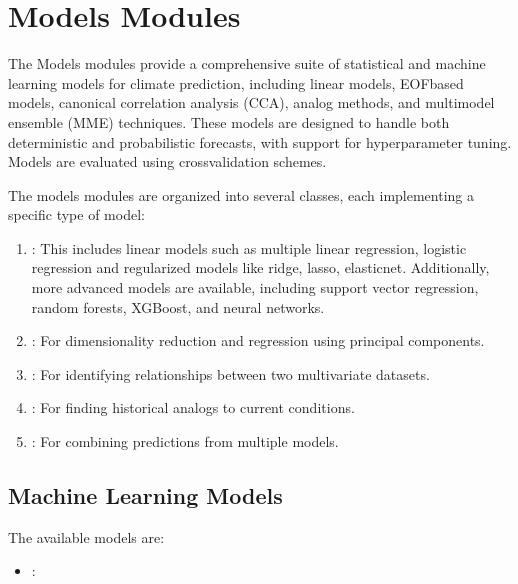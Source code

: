 \documentclass[letterpaper,10pt,english]{sphinxmanual}
\begin{document}
\sphinxstepscope


\section{Models Modules}
\label{\detokenize{Models:models-modules}}\label{\detokenize{Models::doc}}
\sphinxAtStartPar
The Models modules provide a comprehensive suite of statistical and machine learning models for climate prediction, including linear models, EOF\sphinxhyphen{}based models, canonical correlation analysis (CCA), analog methods, and multi\sphinxhyphen{}model ensemble (MME) techniques.
These models are designed to handle both deterministic and probabilistic forecasts, with support for hyperparameter tuning.
Models are evaluated using cross\sphinxhyphen{}validation schemes.

\sphinxAtStartPar
The models modules are organized into several classes, each implementing a specific type of model:
\begin{enumerate}
%
\item {} 
\sphinxAtStartPar
{}: This includes linear models such as multiple linear regression, logistic regression and regularized models like ridge, lasso, elastic\sphinxhyphen{}net. Additionally, more advanced models are available, including support vector regression, random forests, XGBoost, and neural networks.

\item {} 
\sphinxAtStartPar
{}: For dimensionality reduction and regression using principal components.

\item {} 
\sphinxAtStartPar
{}: For identifying relationships between two multivariate datasets.

\item {} 
\sphinxAtStartPar
{}: For finding historical analogs to current conditions.

\item {} 
\sphinxAtStartPar
{}: For combining predictions from multiple models.

\end{enumerate}


\subsection{Machine Learning Models}
\label{\detokenize{Models:machine-learning-models}}
\sphinxAtStartPar
The available models are:
\begin{itemize}
\item {} 
\sphinxAtStartPar
{}:

\end{itemize}
\end{document}
